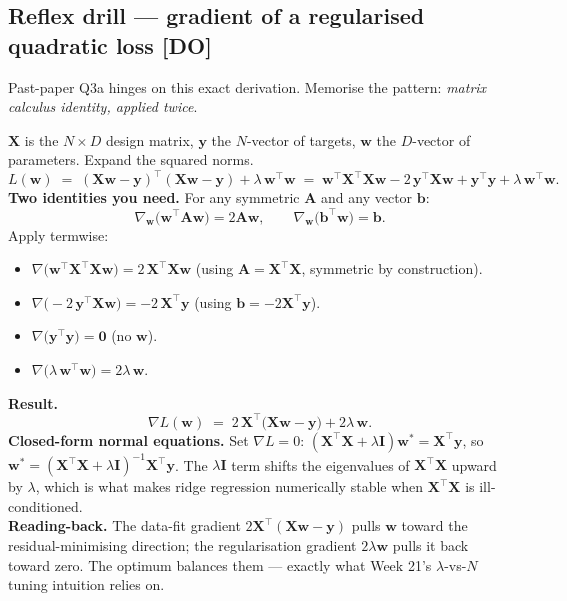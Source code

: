\documentclass[11pt, a4paper]{article}
\newcommand{\doflag}{\textcolor{defBd}{\textbf{[DO]}}\,}
\begin{document}
\subsection{Reflex drill — gradient of a regularised quadratic loss \doflag}

Past-paper Q3a hinges on this exact derivation. Memorise the pattern: \emph{matrix calculus identity, applied twice}.

\begin{exbox}[{Gradient of $L(\mathbf{w}) = \|\mathbf{X}\mathbf{w} - \mathbf{y}\|^2 + \lambda\|\mathbf{w}\|^2$}]
$\mathbf{X}$ is the $N \times D$ design matrix, $\mathbf{y}$ the $N$-vector of targets, $\mathbf{w}$ the $D$-vector of parameters. Expand the squared norms.
\[
L(\mathbf{w}) \;=\; (\mathbf{X}\mathbf{w}-\mathbf{y})^\top(\mathbf{X}\mathbf{w}-\mathbf{y}) + \lambda\,\mathbf{w}^\top\mathbf{w}
            \;=\; \mathbf{w}^\top\mathbf{X}^\top\mathbf{X}\mathbf{w} - 2\,\mathbf{y}^\top\mathbf{X}\mathbf{w} + \mathbf{y}^\top\mathbf{y} + \lambda\,\mathbf{w}^\top\mathbf{w}.
\]
\textbf{Two identities you need.} For any symmetric $\mathbf{A}$ and any vector $\mathbf{b}$:
\[
\nabla_{\mathbf{w}}\bigl(\mathbf{w}^\top\mathbf{A}\mathbf{w}\bigr) = 2\mathbf{A}\mathbf{w}, \qquad
\nabla_{\mathbf{w}}\bigl(\mathbf{b}^\top\mathbf{w}\bigr) = \mathbf{b}.
\]
Apply termwise:
\begin{itemize}[leftmargin=*, itemsep=0pt, topsep=0pt]
  \item $\nabla\!\bigl(\mathbf{w}^\top\mathbf{X}^\top\mathbf{X}\mathbf{w}\bigr) = 2\,\mathbf{X}^\top\mathbf{X}\mathbf{w}$ (using $\mathbf{A} = \mathbf{X}^\top\mathbf{X}$, symmetric by construction).
  \item $\nabla\!\bigl(-2\,\mathbf{y}^\top\mathbf{X}\mathbf{w}\bigr) = -2\,\mathbf{X}^\top\mathbf{y}$ (using $\mathbf{b} = -2\mathbf{X}^\top\mathbf{y}$).
  \item $\nabla\!\bigl(\mathbf{y}^\top\mathbf{y}\bigr) = \mathbf{0}$ (no $\mathbf{w}$).
  \item $\nabla\!\bigl(\lambda\,\mathbf{w}^\top\mathbf{w}\bigr) = 2\lambda\,\mathbf{w}$.
\end{itemize}
\textbf{Result.}
\[
\boxed{\;\nabla L(\mathbf{w}) \;=\; 2\,\mathbf{X}^\top\bigl(\mathbf{X}\mathbf{w} - \mathbf{y}\bigr) + 2\lambda\,\mathbf{w}.\;}
\]
\textbf{Closed-form normal equations.} Set $\nabla L = 0$: $(\mathbf{X}^\top\mathbf{X} + \lambda \mathbf{I})\mathbf{w}^* = \mathbf{X}^\top\mathbf{y}$, so $\mathbf{w}^* = (\mathbf{X}^\top\mathbf{X} + \lambda \mathbf{I})^{-1}\mathbf{X}^\top\mathbf{y}$. The $\lambda \mathbf{I}$ term shifts the eigenvalues of $\mathbf{X}^\top\mathbf{X}$ upward by $\lambda$, which is what makes ridge regression numerically stable when $\mathbf{X}^\top\mathbf{X}$ is ill-conditioned.\\[0.3em]
\textbf{Reading-back.} The data-fit gradient $2\mathbf{X}^\top(\mathbf{X}\mathbf{w}-\mathbf{y})$ pulls $\mathbf{w}$ toward the residual-minimising direction; the regularisation gradient $2\lambda\mathbf{w}$ pulls it back toward zero. The optimum balances them — exactly what Week 21's $\lambda$-vs-$N$ tuning intuition relies on.
\end{exbox}
\end{document}
